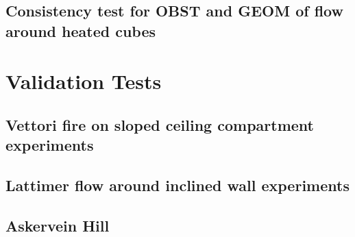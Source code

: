 \documentclass[12pt]{article}
\begin{document}
\subsection{Consistency test for OBST and GEOM of flow around heated cubes}








\section{Validation Tests}

\subsection{Vettori fire on sloped ceiling compartment experiments}





\subsection{Lattimer flow around inclined wall experiments}





\subsection{Askervein Hill}
\end{document}
